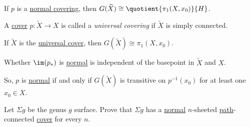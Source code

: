 \begin{corollary}
	If \(p\) is a \hyperref[def:normal-cover]{normal covering}, then \(G(\widetilde{X} ) \cong \quotient{\pi _1(X, x_0)}{H} \).
\end{corollary}

\begin{definition}\label{def:universal-covering}
	A \hyperref[def:covering-map]{cover} \(p\colon \widetilde{X} \to X\) is called a \emph{universal covering} if \(\widetilde{X} \) is simply connected.
\end{definition}
\begin{corollary}
	If \(\widetilde{X} \) is the \hyperref[def:universal-covering]{universal cover}, then \(G(\widetilde{X} )\cong \pi _1(X, x_0)\).
\end{corollary}

\begin{exercise}
	Whether \(\im (p_\ast)\) is \hyperref[def:normal-subgroup]{normal} is independent of the basepoint in \(\widetilde{X} \) and \(X\).
\end{exercise}

So, \(p\) is \hyperref[def:normal-cover]{normal} if and only if \(G(\widetilde{X} )\) is transitive on \(p^{-1} (x_0)\) for at least one
\(x_0\in X\).
\begin{exercise}
	Let \(\Sigma g\) be the genus \(g\) surface. Prove that \(\Sigma g\) has a \hyperref[def:normal-cover]{normal} \(n\)-sheeted \hyperref[def:path]{path}-connected
	\hyperref[def:covering-map]{cover} for every \(n\).
\end{exercise}